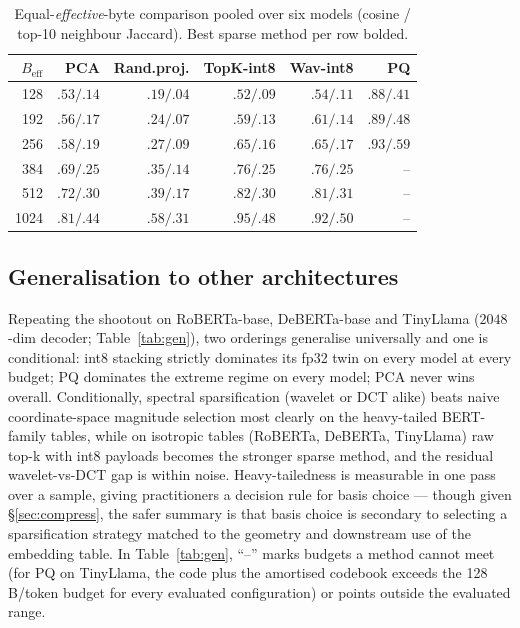 \documentclass[conference]{IEEEtran}
\begin{document}
\begin{table}[t]
\centering
\caption{Equal-\emph{effective}-byte comparison pooled over six models
(cosine / top-10 neighbour Jaccard). Best sparse method per row
bolded.}
\label{tab:effbytes}
\setlength{\tabcolsep}{3.0pt}
\begin{tabular}{rrrrrr}
\toprule
$B_{\mathrm{eff}}$ & PCA & Rand.proj. & TopK-int8 & Wav-int8 & PQ \\
\midrule
128  & $.53/.14$ & $.19/.04$ & $.52/.09$ & $.54/\mathbf{.11}$ &
$\mathbf{.88/.41}$ \\
192  & $.56/.17$ & $.24/.07$ & $.59/.13$ & $.61/\mathbf{.14}$ &
$\mathbf{.89/.48}$ \\
256  & $.58/.19$ & $.27/.09$ & $.65/.16$ & $.65/\mathbf{.17}$ &
$\mathbf{.93/.59}$ \\
384  & $.69/.25$ & $.35/.14$ & $.76/\mathbf{.25}$ & $.76/\mathbf{.25}$ &
-- \\
512  & $.72/.30$ & $.39/.17$ & $\mathbf{.82/.30}$ & $.81/\mathbf{.31}$ &
-- \\
1024 & $.81/.44$ & $.58/.31$ & $\mathbf{.95}/.48$ & $.92/\mathbf{.50}$ &
-- \\
\bottomrule
\end{tabular}
\end{table}

\subsection{Generalisation to other architectures}
\label{sec:gen}
Repeating the shootout on RoBERTa-base, DeBERTa-base and TinyLlama
($2048$-dim decoder; Table~\ref{tab:gen}), two orderings generalise
universally and one is conditional: int8 stacking strictly dominates its
fp32 twin on every model at every budget; PQ dominates the extreme
regime on every model; PCA never wins overall. Conditionally, spectral
sparsification (wavelet or DCT alike) beats naive coordinate-space
magnitude selection most clearly on the heavy-tailed BERT-family tables,
while on isotropic tables (RoBERTa, DeBERTa, TinyLlama) raw top-k with
int8 payloads becomes the stronger sparse method, and the residual
wavelet-vs-DCT gap is within noise. Heavy-tailedness is measurable in
one pass over a sample, giving practitioners a decision rule for basis
choice --- though given \S\ref{sec:compress}, the safer summary is that
basis choice is secondary to selecting a sparsification strategy
matched to the geometry and downstream use of the embedding table. In
Table~\ref{tab:gen}, ``--'' marks budgets a method cannot meet (for PQ
on TinyLlama, the code plus the amortised codebook exceeds the
128\,B/token budget for every evaluated configuration) or points
outside the evaluated range.
\end{document}
